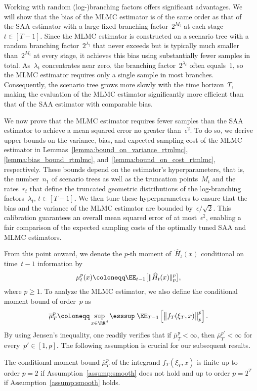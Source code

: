 \documentclass[11pt]{article}
\let\hat\widehat
\begin{document}
Working with random (log-)branching factors offers significant advantages. We will show that the bias of the MLMC estimator is of the same order as that of the SAA estimator with a large fixed branching factor~$2^{M_t}$ at each stage~$t\in[T-1]$. Since the MLMC estimator is constructed on a scenario tree with a random branching factor~$2^{\lambda_t}$ that never exceeds but is typically much smaller than~$2^{M_t}$ at every stage, it achieves this bias using substantially fewer samples in total. As~$\lambda_t$ concentrates near zero, the branching factor~$2^{\lambda_t}$ often equals~$1$, so the MLMC estimator requires only a single sample in most branches. Consequently, the scenario tree grows more slowly with the time horizon~$T$, making the evaluation of the MLMC estimator significantly more efficient than that of the SAA estimator with comparable bias.


We now prove that the MLMC estimator requires fewer samples than the SAA estimator to achieve a mean squared error no greater than~$\epsilon^2$. To do so, we derive upper bounds on the variance, bias, and expected sampling cost of the MLMC estimator in Lemmas~\ref{lemma:bound_on_variance_rtmlmc}, \ref{lemma:bias_bound_rtmlmc}, and~\ref{lemma:bound_on_cost_rtmlmc}, respectively. These bounds depend on the estimator’s hyperparameters, that is, the number~$n_1$ of scenario trees as well as the truncation points~$M_t$ and the rates~$r_t$ that define the truncated geometric distributions of the log-branching factors~$\lambda_t$, $t \in [T-1]$. We then tune these hyperparameters to ensure that the bias and the variance of the MLMC estimator are bounded by~$\epsilon/\sqrt{2}$. This calibration guarantees an overall mean squared error of at most~$\epsilon^2$, enabling a fair comparison of the expected sampling costs of the optimally tuned SAA and MLMC estimators.

From this point onward, we denote the $p$-th moment of~$\hat{H}_t(x)$ conditional on time~$t-1$ information by
\begin{align}
\label{eq:mu}
    \mu_t^{p}(x) \coloneqq \EE_{t-1}\big[\|\hat{H}_t(x)\|_p^p \big],
\end{align}
where $p \geq 1$. To analyze the MLMC estimator, we also define the conditional moment bound of order~$p$ as
\begin{align}\label{eq:mu_bar_def}
    \overline\mu_T^p\coloneqq \sup_{x\in\RR^{d}}\esssup \; \EE_{T-1} \left[ \big\|f_T(\xi_T,x)\big\|^p_p \right].
\end{align}
By using Jensen's inequality, one readily verifies that if $\overline\mu_T^p<\infty$, then $\overline\mu_T^{p'}<\infty$ for every~$p'\in[1,p]$. The following assumption is crucial for our subsequent results.
\begin{assumption}\label{assump:mu_bar}
    The conditional moment bound $\overline{\mu}_T^p $ of the integrand $f_T(\xi_T,x)$ is finite up to order $p=2$ if Assumption~\ref{assump:smooth} does not hold and up to order $p=2^T$ if Assumption~\ref{assump:smooth} holds.
\end{assumption}
\end{document}
